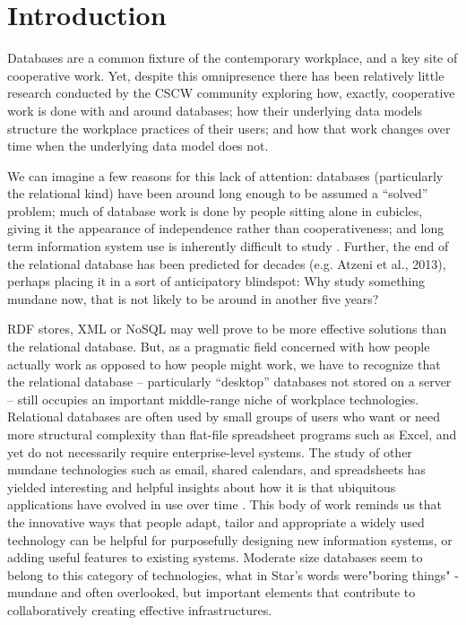\section{Introduction}

Databases are a common fixture of the contemporary workplace, and a key site of cooperative work. Yet, despite this omnipresence there has been relatively little research conducted by the CSCW community exploring how, exactly, cooperative work is done with and around databases;  how their underlying data models structure the workplace practices of their users; and how that work changes over time when the underlying data model does not. 

We can imagine a few reasons for this lack of attention: databases (particularly the relational kind) have been around long enough to be assumed a “solved” problem; much of database work is done by people sitting alone in cubicles, giving it the appearance of independence rather than cooperativeness; and long term information system use is inherently difficult to study \cite{Pipek_2002}. Further, the end of the relational database has been predicted for decades (e.g. Atzeni et al., 2013), perhaps placing it in a sort of anticipatory blindspot: Why study something mundane now, that is not likely to be around in another five years? 

RDF stores, XML or NoSQL may well prove to be more effective solutions than the relational database. But, as a pragmatic field concerned with how people actually work as opposed to how people might work, we have to recognize that the relational database – particularly “desktop” databases not stored on a server – still occupies an important middle-range niche of workplace technologies. Relational databases are often used by small groups of users who want or need more structural complexity than flat-file spreadsheet programs such as Excel, and yet do not necessarily require enterprise-level systems. The study of other mundane technologies such as email, shared calendars, and spreadsheets has yielded interesting and helpful insights about how it is that ubiquitous applications have evolved in use over time  \cite{bellotti2005quality, palen1999social, nardi1991twinkling}. This body of work reminds us that the innovative ways that people adapt, tailor and appropriate a widely used technology can be helpful for purposefully designing new information systems, or adding useful features to existing systems. Moderate size databases seem to  belong to this category of technologies, what in Star's words were"boring things" \cite{star1999ethnography} -  mundane and often overlooked, but important elements that contribute to collaboratively creating effective infrastructures.  


